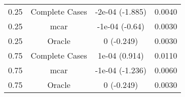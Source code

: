 \begin{table}[ht]
\centering
\begin{tabular}{cccc}
  \hline
  \hline
0.25 & Complete Cases & -2e-04 (-1.885) & 0.0040 \\ 
  0.25 & mcar & -1e-04 (-0.64) & 0.0030 \\ 
  0.25 & Oracle & 0 (-0.249) & 0.0030 \\ 
  0.75 & Complete Cases & 1e-04 (0.914) & 0.0110 \\ 
  0.75 & mcar & -1e-04 (-1.236) & 0.0060 \\ 
  0.75 & Oracle & 0 (-0.249) & 0.0030 \\ 
   \hline
\end{tabular}
\end{table}
